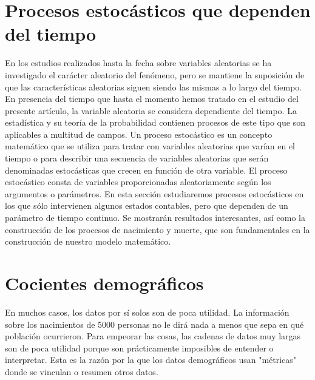 \documentclass[a4paper,11pt]{book}
\begin{document}
\chapter{Procesos estocásticos que dependen del tiempo}
En los estudios realizados hasta la fecha sobre variables aleatorias se ha investigado el carácter aleatorio del fenómeno, pero se mantiene la suposición de que
    las características aleatorias siguen siendo las mismas a lo largo del tiempo.\\
    En presencia del tiempo que hasta el momento hemos tratado en el estudio del presente artículo, la variable aleatoria se considera dependiente del tiempo. La estadística y su teoría de la probabilidad contienen procesos de este tipo que son aplicables a multitud de campos. Un proceso estocástico es un concepto matemático que se utiliza para tratar con variables aleatorias que varían en el tiempo o para describir una secuencia de variables aleatorias que serán denominadas estocásticas que crecen en función de otra variable. El proceso estocástico consta de variables proporcionadas aleatoriamente según los argumentos o parámetros.
    En esta sección estudiaremos procesos estocásticos en los que sólo intervienen algunos estados contables, pero que dependen de un parámetro de tiempo continuo. Se mostrarán resultados interesantes, así como la construcción de los procesos de nacimiento y muerte, que son fundamentales en la construcción de nuestro modelo matemático.
    
    
    
    
    
\chapter{Cocientes demográficos}
 En muchos casos, los datos por sí solos son de poca utilidad. La información sobre los nacimientos de 5000 personas no le dirá nada a menos que sepa en qué población ocurrieron. Para empeorar las cosas, las cadenas de datos muy largas son de poca utilidad porque son prácticamente imposibles de entender o interpretar. Esta es la razón por la que los datos demográficos usan "métricas" donde se vinculan o resumen otros datos.
    
    
\end{document}
